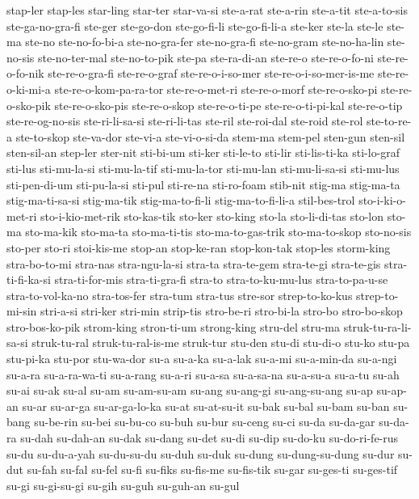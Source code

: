 {stap-ler stap-les star-ling star-ter star-va-si ste-a-rat ste-a-rin
ste-a-tit ste-a-to-sis ste-ga-no-gra-fi ste-ger ste-go-don ste-go-fi-li
ste-go-fi-li-a ste-ker ste-la ste-le ste-ma ste-no ste-no-fo-bi-a
ste-no-gra-fer ste-no-gra-fi ste-no-gram ste-no-ha-lin ste-no-sis
ste-no-ter-mal ste-no-to-pik ste-pa ste-ra-di-an ste-re-o ste-re-o-fo-ni
ste-re-o-fo-nik ste-re-o-gra-fi ste-re-o-graf ste-re-o-i-so-mer
ste-re-o-i-so-mer-is-me ste-re-o-ki-mi-a ste-re-o-kom-pa-ra-tor
ste-re-o-met-ri ste-re-o-morf ste-re-o-sko-pi ste-re-o-sko-pik
ste-re-o-sko-pis ste-re-o-skop ste-re-o-ti-pe ste-re-o-ti-pi-kal
ste-re-o-tip ste-re-og-no-sis ste-ri-li-sa-si ste-ri-li-tas ste-ril
ste-roi-dal ste-roid ste-rol ste-to-re-a ste-to-skop ste-va-dor ste-vi-a
ste-vi-o-si-da stem-ma stem-pel sten-gun sten-sil sten-sil-an step-ler
ster-nit sti-bi-um sti-ker sti-le-to sti-lir sti-lis-ti-ka sti-lo-graf
sti-lus sti-mu-la-si sti-mu-la-tif sti-mu-la-tor sti-mu-lan
sti-mu-li-sa-si sti-mu-lus sti-pen-di-um sti-pu-la-si sti-pul sti-re-na
sti-ro-foam stib-nit stig-ma stig-ma-ta stig-ma-ti-sa-si stig-ma-tik
stig-ma-to-fi-li stig-ma-to-fi-li-a stil-bes-trol sto-i-ki-o-met-ri
sto-i-kio-met-rik sto-kas-tik sto-ker sto-king sto-la sto-li-di-tas
sto-lon sto-ma sto-ma-kik sto-ma-ta sto-ma-ti-tis sto-ma-to-gas-trik
sto-ma-to-skop sto-no-sis sto-per sto-ri stoi-kis-me stop-an stop-ke-ran
stop-kon-tak stop-les storm-king stra-bo-to-mi stra-nas stra-ngu-la-si
stra-ta stra-te-gem stra-te-gi stra-te-gis stra-ti-fi-ka-si
stra-ti-for-mis stra-ti-gra-fi stra-to stra-to-ku-mu-lus stra-to-pa-u-se
stra-to-vol-ka-no stra-tos-fer stra-tum stra-tus stre-sor strep-to-ko-kus
strep-to-mi-sin stri-a-si stri-ker stri-min strip-tis stro-be-ri
stro-bi-la stro-bo stro-bo-skop stro-bos-ko-pik strom-king stron-ti-um
strong-king stru-del stru-ma struk-tu-ra-li-sa-si struk-tu-ral
struk-tu-ral-is-me struk-tur stu-den stu-di stu-di-o stu-ko stu-pa
stu-pi-ka stu-por stu-wa-dor su-a su-a-ka su-a-lak su-a-mi su-a-min-da
su-a-ngi su-a-ra su-a-ra-wa-ti su-a-rang su-a-ri su-a-sa su-a-sa-na
su-a-su-a su-a-tu su-ah su-ai su-ak su-al su-am su-am-su-am su-ang
su-ang-gi su-ang-su-ang su-ap su-ap-an su-ar su-ar-ga su-ar-ga-lo-ka su-at
su-at-su-it su-bak su-bal su-bam su-ban su-bang su-be-rin su-bei su-bu-co
su-buh su-bur su-ceng su-ci su-da su-da-gar su-da-ra su-dah su-dah-an
su-dak su-dang su-det su-di su-dip su-do-ku su-do-ri-fe-rus su-du
su-du-a-yah su-du-su-du su-duh su-duk su-dung su-dung-su-dung su-dur
su-dut su-fah su-fal su-fel su-fi su-fiks su-fis-me su-fis-tik su-gar
su-ges-ti su-ges-tif su-gi su-gi-su-gi su-gih su-guh su-guh-an su-gul
}
